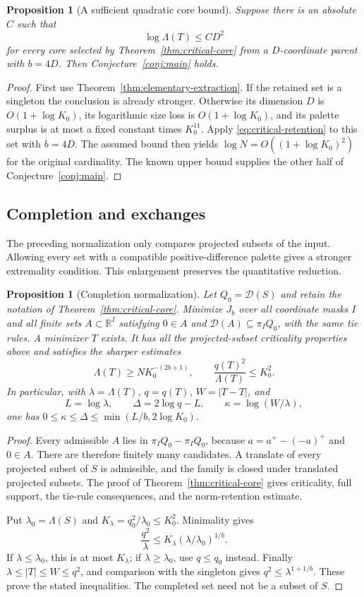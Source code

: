\documentclass[11pt]{amsart}
\newtheorem{proposition}[theorem]{Proposition}
\theoremstyle{definition}
\theoremstyle{remark}
\newcommand{\R}{\mathbb{R}}
\newcommand{\Dp}{\mathcal{D}}
\begin{document}
\begin{proposition}[A sufficient quadratic core bound]\label{prop:core-suffices}
Suppose there is an absolute $C$ such that
\[
\log\Lambda(T)\le CD^2
\]
for every core selected by Theorem~\ref{thm:critical-core} from a $D$-coordinate parent with $b=4D$. Then Conjecture~\ref{conj:main} holds.
\end{proposition}
\begin{proof}
First use Theorem~\ref{thm:elementary-extraction}. If the retained set is a singleton the conclusion is already stronger. Otherwise its dimension $D$ is $O(1+\log K_0)$, its logarithmic size loss is $O(1+\log K_0)$, and its palette surplus is at most a fixed constant times $K_0^{11}$. Apply \eqref{eq:critical-retention} to this set with $b=4D$. The assumed bound then yields $\log N=O((1+\log K_0)^2)$ for the original cardinality. The known upper bound supplies the other half of Conjecture~\ref{conj:main}.
\end{proof}


\subsection*{Completion and exchanges}
The preceding normalization only compares projected subsets of the input. Allowing every set with a compatible positive-difference palette gives a stronger extremality condition. This enlargement preserves the quantitative reduction.

\begin{proposition}[Completion normalization]\label{prop:completion}
Let $Q_0=\Dp(S)$ and retain the notation of Theorem~\ref{thm:critical-core}. Minimize $J_b$ over all coordinate masks $I$ and all finite sets $A\subset\R^I$ satisfying $0\in A$ and $\Dp(A)\subseteq\pi_IQ_0$, with the same tie rules. A minimizer $T$ exists. It has all the projected-subset criticality properties above and satisfies the sharper estimates
\[
\Lambda(T)\ge NK_0^{-(2b+1)},\qquad
\frac{q(T)^2}{\Lambda(T)}\le K_0^2.
\]
In particular, with $\lambda=\Lambda(T)$, $q=q(T)$, $W=|T-T|$, and
\[
L=\log\lambda,\qquad \Delta=2\log q-L,\qquad
\kappa=\log(W/\lambda),
\]
one has $0\le\kappa\le\Delta\le\min(L/b,2\log K_0)$.
\end{proposition}
\begin{proof}
Every admissible $A$ lies in $\pi_IQ_0-\pi_IQ_0$, because $a=a^+-(-a)^+$ and $0\in A$. There are therefore finitely many candidates. A translate of every projected subset of $S$ is admissible, and the family is closed under translated projected subsets. The proof of Theorem~\ref{thm:critical-core} gives criticality, full support, the tie-rule consequences, and the norm-retention estimate.

Put $\lambda_0=\Lambda(S)$ and $K_\lambda=q_0^2/\lambda_0\le K_0^2$. Minimality gives
\[
\frac{q^2}{\lambda}\le K_\lambda(\lambda/\lambda_0)^{1/b}.
\]
If $\lambda\le\lambda_0$, this is at most $K_\lambda$; if $\lambda\ge\lambda_0$, use $q\le q_0$ instead. Finally $\lambda\le|T|\le W\le q^2$, and comparison with the singleton gives $q^2\le\lambda^{1+1/b}$. These prove the stated inequalities. The completed set need not be a subset of $S$.
\end{proof}
\end{document}

